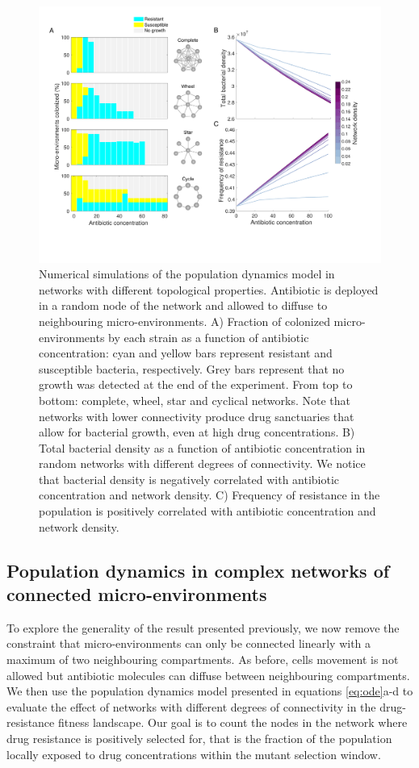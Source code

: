 \documentclass[fleqn,12pt]{wlscirep}
\begin{document}
\begin{figure}[ht!]
\centering
\includegraphics[width=1\linewidth]{figures/Figure5.pdf}
\caption{Numerical simulations of the population dynamics model in networks with different topological properties. Antibiotic is deployed in a random node of the network and allowed to diffuse to neighbouring micro-environments. A) Fraction of colonized micro-environments by each strain as a function of antibiotic concentration: cyan and yellow bars represent resistant and susceptible bacteria, respectively. Grey bars represent that no growth was detected at the end of the experiment. From top to bottom: complete, wheel, star and cyclical networks.  Note that networks with lower connectivity produce drug sanctuaries that allow for bacterial growth, even at high drug concentrations. B) Total bacterial density as a function of antibiotic concentration in random networks with different degrees of connectivity. We notice that bacterial density is negatively correlated with antibiotic concentration and network density. C) Frequency of resistance in the population is positively correlated with antibiotic concentration and network density.}
\label{fig:figure5}
\end{figure}

\subsection*{Population dynamics in complex networks of connected micro-environments}

To explore the generality of the result presented previously, we now remove the constraint that micro-environments can only be connected linearly with a maximum of two neighbouring compartments.  As before, cells movement is not allowed but antibiotic molecules can diffuse between neighbouring compartments. We then use the population dynamics model presented in equations \ref{eq:ode}a-d to evaluate the effect of networks with different degrees of connectivity in the drug-resistance fitness landscape. Our goal is to count the nodes in the network where drug resistance is positively selected for, that is the fraction of the population locally exposed to drug concentrations within the mutant selection window.
\end{document}
